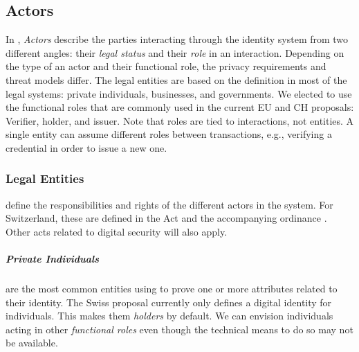 \subsection{Actors}
\label{subsub:actors}

In \emph{\rot}, \emph{Actors} describe the parties interacting through the identity system from two different angles: their \emph{legal status} and their \emph{role} in an interaction.
Depending on the type of an actor and their functional role, the privacy requirements and threat models differ.
The legal entities are based on the definition in most of the legal systems: private individuals, businesses, and governments.
We elected to use the functional roles that are commonly used in the current EU and CH proposals: Verifier, holder, and issuer.
Note that roles are tied to interactions, not entities. 
A single entity can assume different roles between transactions, e.g., verifying a credential in order to issue a new one.


\vspace{1em}


\subsubsection{Legal Entities} define the responsibilities and rights of the different actors in the system.
For Switzerland, these are defined in the \eid Act \cite{BGEID24} and the accompanying ordinance \cite{VEID25}.
Other acts related to digital security will also apply.

\subparagraph{Private Individuals}
are the most common entities using \eid to prove one or more attributes related to their identity.
The Swiss proposal currently only defines a digital identity for individuals.
This makes them \emph{holders} by default. We can envision individuals acting in other \emph{functional roles} even though the technical means to do so may not be available.

